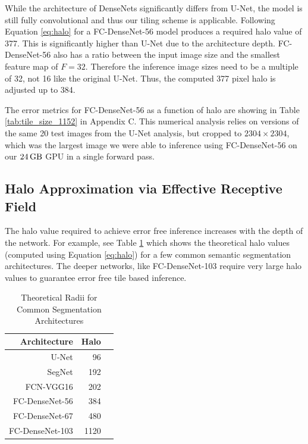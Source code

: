 \documentclass[runningheads]{llncs}
\begin{document}
While the architecture of DenseNets significantly differs from U-Net, the model is still fully convolutional and thus our tiling scheme is applicable. Following Equation \ref{eq:halo} for a FC-DenseNet-56 \cite{Jegou2017} model produces a required halo value of 377. This is significantly higher than U-Net due to the architecture depth. FC-DenseNet-56 also has a ratio between the input image size and the smallest feature map of $F = 32$. Therefore the inference image sizes need to be a multiple of 32, not 16 like the original U-Net. Thus, the computed 377 pixel halo is adjusted up to 384. 

The error metrics for FC-DenseNet-56 as a function of halo are showing in Table \ref{tab:tile_size_1152} in Appendix C. This numerical analysis relies on versions of the same 20 test images from the U-Net analysis, but cropped to $\num{2304} \times \num{2304}$, which was the largest image we were able to inference using FC-DenseNet-56 on our $\SI{24}{\giga\byte}$ GPU in a single forward pass. 


\subsection{Halo Approximation via Effective Receptive Field}

The halo value required to achieve error free inference increases with the depth of the network. For example, see Table \ref{tab:common_radii} which shows the theoretical halo values (computed using Equation \ref{eq:halo}) for a few common semantic segmentation architectures. The deeper networks, like FC-DenseNet-103 require very large halo values to guarantee error free tile based inference.

\begin{table}[h!]
	\centering
	\caption{Theoretical Radii for Common Segmentation Architectures}
	\label{tab:common_radii}
	\begin{tabular}{r|r|r}
		Architecture & Halo &  \\ 
		\hline
		U-Net \cite{Ronneberger2015a} & 96 \\
		SegNet \cite{Badrinarayanan2015a} & 192 \\
		FCN-VGG16 \cite{Long2015} & 202 \\
		FC-DenseNet-56 \cite{Jegou2017} & 384 \\
		FC-DenseNet-67 \cite{Jegou2017} & 480 \\
		FC-DenseNet-103 \cite{Jegou2017} & 1120 \\
	\end{tabular}
\end{table}
\end{document}
